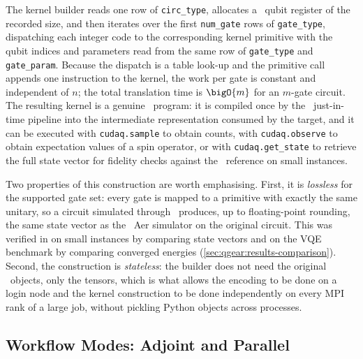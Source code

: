 The kernel builder reads one row of \texttt{circ\_type}, allocates a \cudaq\ qubit register of the recorded size, and then iterates over the first \texttt{num\_gate} rows of \texttt{gate\_type}, dispatching each integer code to the corresponding kernel primitive with the qubit indices and parameters read from the same row of \texttt{gate\_type} and \texttt{gate\_param}. Because the dispatch is a table look-up and the primitive call appends one instruction to the kernel, the work per gate is constant and independent of $n$; the total translation time is $\bigO{m}$ for an $m$-gate circuit. The resulting kernel is a genuine \cudaq\ program: it is compiled once by the \cudaq\ just-in-time pipeline into the intermediate representation consumed by the target, and it can be executed with \texttt{cudaq.sample} to obtain counts, with \texttt{cudaq.observe} to obtain expectation values of a spin operator, or with \texttt{cudaq.get\_state} to retrieve the full state vector for fidelity checks against the \qiskit\ reference on small instances.

Two properties of this construction are worth emphasising. First, it is \emph{lossless} for the supported gate set: every gate is mapped to a primitive with exactly the same unitary, so a circuit simulated through \qgear\ produces, up to floating-point rounding, the same state vector as the \qiskit\ Aer simulator on the original circuit. This was verified in \cite{guo2025qgear} on small instances by comparing state vectors and on the VQE benchmark by comparing converged energies (\cref{sec:qgear:results-comparison}). Second, the construction is \emph{stateless}: the builder does not need the original \qiskit\ objects, only the tensors, which is what allows the encoding to be done on a login node and the kernel construction to be done independently on every MPI rank of a large job, without pickling Python objects across processes.

\subsection{Workflow Modes: Adjoint and Parallel}\label{sec:qgear:modes}

